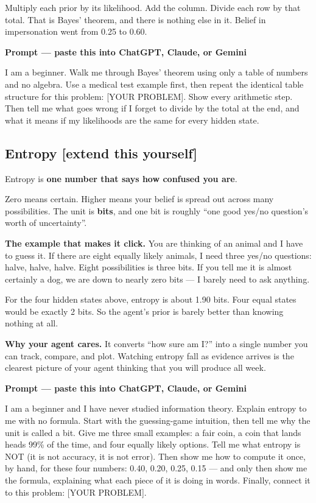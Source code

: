 \documentclass[11pt,a4paper]{article}
\newcommand{\keyword}[1]{\textbf{#1}}
\newcommand{\boxtitle}[1]{{\bfseries #1}\par\vspace{2pt}}
\newcommand{\taught}{\hfill{\footnotesize\sffamily\color{sbaccent}[extend this yourself]}}
\newenvironment{learnprompt}
  {\begin{sbbox}\boxtitle{Prompt --- paste this into ChatGPT, Claude, or Gemini}%
   \ttfamily\small\raggedright}
  {\end{sbbox}}
\begin{document}
Multiply each prior by its likelihood. Add the column. Divide each row by that total. That is
Bayes' theorem, and there is nothing else in it. Belief in impersonation went from 0.25 to 0.60.

\begin{learnprompt}
I am a beginner. Walk me through Bayes' theorem using only a table of numbers and no algebra.
Use a medical test example first, then repeat the identical table structure for this problem:
[YOUR PROBLEM]. Show every arithmetic step. Then tell me what goes wrong if I forget to divide
by the total at the end, and what it means if my likelihoods are the same for every hidden state.
\end{learnprompt}

\subsection{Entropy \taught}

Entropy is \textbf{one number that says how confused you are}.

Zero means certain. Higher means your belief is spread out across many possibilities. The unit
is \keyword{bits}, and one bit is roughly ``one good yes/no question's worth of uncertainty''.

\textbf{The example that makes it click.} You are thinking of an animal and I have to guess it.
If there are eight equally likely animals, I need three yes/no questions: halve, halve, halve.
Eight possibilities is three bits. If you tell me it is almost certainly a dog, we are down to
nearly zero bits --- I barely need to ask anything.

For the four hidden states above, entropy is about 1.90 bits. Four equal states would be exactly
2 bits. So the agent's prior is barely better than knowing nothing at all.

\textbf{Why your agent cares.} It converts ``how sure am I?'' into a single number you can track,
compare, and plot. Watching entropy fall as evidence arrives is the clearest picture of your
agent thinking that you will produce all week.

\begin{learnprompt}
I am a beginner and I have never studied information theory. Explain entropy to me with no
formula. Start with the guessing-game intuition, then tell me why the unit is called a bit.
Give me three small examples: a fair coin, a coin that lands heads 99\% of the time, and four
equally likely options. Tell me what entropy is NOT (it is not accuracy, it is not error). Then
show me how to compute it once, by hand, for these four numbers: 0.40, 0.20, 0.25, 0.15 --- and
only then show me the formula, explaining what each piece of it is doing in words. Finally,
connect it to this problem: [YOUR PROBLEM].
\end{learnprompt}
\end{document}
